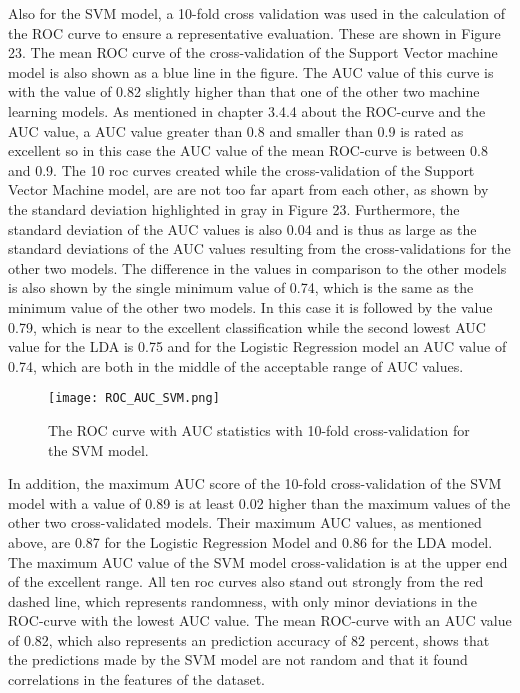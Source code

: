 \documentclass[../masterarbeit.tex]{subfiles}
\begin{document}
Also for the SVM model, a 10-fold cross validation was used in the calculation of the ROC curve to ensure a representative evaluation. These are shown in Figure 23. 
The mean ROC curve of the cross-validation of the Support Vector machine model is also shown as a blue line in the figure. The AUC value of this curve is with the value of 0.82 slightly higher than that one of the other two machine learning models. As mentioned in chapter 3.4.4 about the ROC-curve and the AUC value, a AUC value greater than 0.8 and smaller than 0.9 is rated as excellent so in this case the AUC value of the mean ROC-curve is between 0.8 and 0.9. The 10 roc curves created while the cross-validation of the Support Vector Machine model, are are not too far apart from each other, as shown by the standard deviation highlighted in gray in Figure 23. Furthermore, the standard deviation of the AUC values is also 0.04 and is thus as large as the standard deviations of the AUC values resulting from the cross-validations for the other two models. The difference in the values in comparison to the other models is also shown by the single minimum value of 0.74, which is the same as the minimum value of the other two models. In this case it is followed by the value 0.79, which is near to the excellent classification while the second lowest AUC value for the LDA is 0.75 and for the Logistic Regression model an AUC value of 0.74, which are both in the middle of the acceptable range of AUC values. \\
\begin{figure}[h]
    \centering
    \texttt{[image: ROC\_AUC\_SVM.png]}
    \caption{The ROC curve with AUC statistics with 10-fold cross-validation for the SVM model.}
\end{figure}
In addition, the maximum AUC score of the 10-fold cross-validation of the SVM model with a value of 0.89 is at least 0.02 higher than the maximum values of the other two cross-validated models. Their maximum AUC values, as mentioned above, are 0.87 for the Logistic Regression Model and 0.86 for the LDA model. The maximum AUC value of the SVM model cross-validation is at the upper end of the excellent range. All ten roc curves also stand out strongly from the red dashed line, which represents randomness, with only minor deviations in the ROC-curve with the lowest AUC value. The mean ROC-curve with an AUC value of 0.82, which also represents an prediction accuracy of 82 percent, shows that the predictions made by the SVM model are not random and that it found correlations in the features of the dataset. \\
\end{document}
